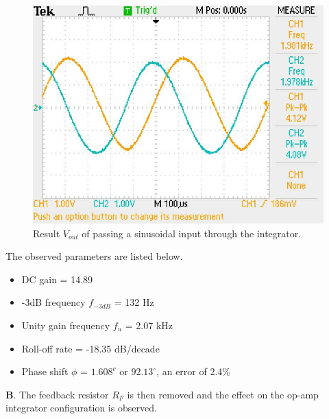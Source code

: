 \documentclass[12pt, titlepage]{article}
\theoremstyle{definition}
\begin{document}
    \begin{figure}[h]
      \centering
      \includegraphics[scale=0.5]{images/results_q1.jpeg}
      \caption{Result \color{cyan}$V_{out}$ \color{black}of passing a sinusoidal input  \color{black}through the integrator.}
      \label{fig:results_q1}
    \end{figure}

    The observed parameters are listed below.
    \begin{itemize}
      \item[] DC gain = 14.89
      \item[] -3dB frequency $f_{-3dB}$ = 132 Hz
      \item[] Unity gain frequency $f_u$ = 2.07 kHz
      \item[] Roll-off rate = -18.35 dB/decade
      \item[] Phase shift $\phi$ = $1.608^{c}$ or $92.13^{\circ}$, an error of 2.4\%
    \end{itemize}

    \newpage
    \textbf{B}. The feedback resistor $R_F$ is then removed and the effect on the op-amp integrator configuration is observed.
\end{document}
